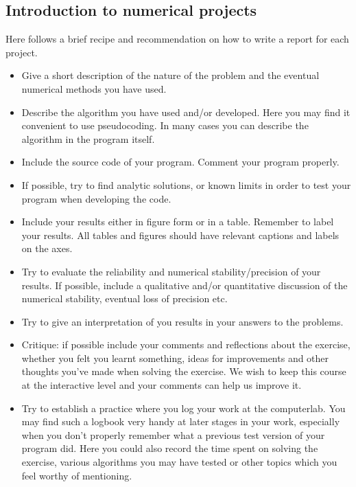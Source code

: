 \documentclass[%
oneside,                 %
final,                   %
10pt]{article}
\begin{document}
\subsection*{Introduction to numerical projects}

Here follows a brief recipe and recommendation on how to write a report for each
project.

\begin{itemize}
  \item Give a short description of the nature of the problem and the eventual  numerical methods you have used.

  \item Describe the algorithm you have used and/or developed. Here you may find it convenient to use pseudocoding. In many cases you can describe the algorithm in the program itself.

  \item Include the source code of your program. Comment your program properly.

  \item If possible, try to find analytic solutions, or known limits in order to test your program when developing the code.

  \item Include your results either in figure form or in a table. Remember to        label your results. All tables and figures should have relevant captions        and labels on the axes.

  \item Try to evaluate the reliability and numerical stability/precision of your results. If possible, include a qualitative and/or quantitative discussion of the numerical stability, eventual loss of precision etc.

  \item Try to give an interpretation of you results in your answers to  the problems.

  \item Critique: if possible include your comments and reflections about the  exercise, whether you felt you learnt something, ideas for improvements and  other thoughts you've made when solving the exercise. We wish to keep this course at the interactive level and your comments can help us improve it.

  \item Try to establish a practice where you log your work at the  computerlab. You may find such a logbook very handy at later stages in your work, especially when you don't properly remember  what a previous test version  of your program did. Here you could also record  the time spent on solving the exercise, various algorithms you may have tested or other topics which you feel worthy of mentioning.
\end{itemize}
\end{document}
